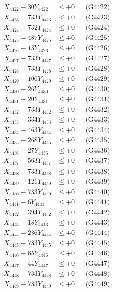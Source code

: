 \documentclass[a4paper,10pt]{article}
\begin{document}
{\begin{align}
X_{4422} - 30Y_{4422} &\leq +0 && \text{(G4422)} \\
X_{4423} - 733Y_{4423} &\leq +0 && \text{(G4423)} \\
X_{4424} - 732Y_{4424} &\leq +0 && \text{(G4424)} \\
X_{4425} - 487Y_{4425} &\leq +0 && \text{(G4425)} \\
X_{4426} - 13Y_{4426} &\leq +0 && \text{(G4426)} \\
X_{4427} - 733Y_{4427} &\leq +0 && \text{(G4427)} \\
X_{4428} - 733Y_{4428} &\leq +0 && \text{(G4428)} \\
X_{4429} - 106Y_{4429} &\leq +0 && \text{(G4429)} \\
X_{4430} - 26Y_{4430} &\leq +0 && \text{(G4430)} \\
\allowbreak
X_{4431} - 20Y_{4431} &\leq +0 && \text{(G4431)} \\
X_{4432} - 733Y_{4432} &\leq +0 && \text{(G4432)} \\
X_{4433} - 334Y_{4433} &\leq +0 && \text{(G4433)} \\
X_{4434} - 463Y_{4434} &\leq +0 && \text{(G4434)} \\
X_{4435} - 268Y_{4435} &\leq +0 && \text{(G4435)} \\
X_{4436} - 27Y_{4436} &\leq +0 && \text{(G4436)} \\
X_{4437} - 563Y_{4437} &\leq +0 && \text{(G4437)} \\
X_{4438} - 733Y_{4438} &\leq +0 && \text{(G4438)} \\
X_{4439} - 121Y_{4439} &\leq +0 && \text{(G4439)} \\
X_{4440} - 733Y_{4440} &\leq +0 && \text{(G4440)} \\
\allowbreak
X_{4441} - 6Y_{4441} &\leq +0 && \text{(G4441)} \\
X_{4442} - 394Y_{4442} &\leq +0 && \text{(G4442)} \\
X_{4443} - 18Y_{4443} &\leq +0 && \text{(G4443)} \\
X_{4444} - 236Y_{4444} &\leq +0 && \text{(G4444)} \\
X_{4445} - 733Y_{4445} &\leq +0 && \text{(G4445)} \\
X_{4446} - 65Y_{4446} &\leq +0 && \text{(G4446)} \\
X_{4447} - 44Y_{4447} &\leq +0 && \text{(G4447)} \\
X_{4448} - 733Y_{4448} &\leq +0 && \text{(G4448)} \\
X_{4449} - 733Y_{4449} &\leq +0 && \text{(G4449)} \\

\end{align}}
\end{document}
